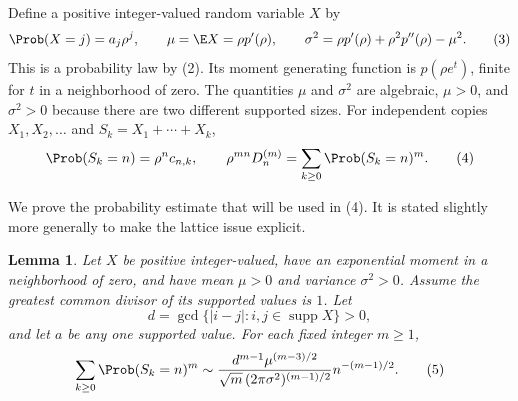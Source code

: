 \documentclass[11pt,a4paper]{article}
\numberwithin{equation}{section}
\newtheorem{lemma}[theorem]{Lemma}
\theoremstyle{definition}
\theoremstyle{remark}
\begin{document}
Define a positive integer-valued random variable $X$ by
\[
 \Prob(X=j)=a_j\rho^j,
 \qquad
 \mu=\E X=\rho p'(\rho),\qquad
 \sigma^2=\rho p'(\rho)+\rho^2p''(\rho)-\mu^2.        \tag{3}
\]
This is a probability law by (2).  Its moment generating function is
$p(\rho e^t)$, finite for $t$ in a neighborhood of zero.  The quantities
$\mu$ and $\sigma^2$ are algebraic, $\mu>0$, and $\sigma^2>0$ because
there are two different supported sizes.  For independent copies
$X_1,X_2,\ldots$ and $S_k=X_1+\cdots+X_k$,
\[
 \Prob(S_k=n)=\rho^n c_{n,k},\qquad
 \rho^{mn}D_n^{(m)}=\sum_{k\ge0}\Prob(S_k=n)^m.       \tag{4}
\]

We prove the probability estimate that will be used in (4).  It is stated
slightly more generally to make the lattice issue explicit.

\begin{lemma}\label{add43taisho:r43:llt}
Let $X$ be positive integer-valued, have an exponential moment in a
neighborhood of zero, and have mean $\mu>0$ and variance $\sigma^2>0$.
Assume the greatest common divisor of its supported values is $1$.
Let
\[
 d=\gcd\{|i-j|:i,j\in\operatorname{supp}X\}>0,
\]
and let $a$ be any one supported value.  For each fixed integer $m\ge1$,
\[
 \sum_{k\ge0}\Prob(S_k=n)^m
 \sim
 \frac{d^{m-1}\mu^{(m-3)/2}}
      {\sqrt m\,(2\pi\sigma^2)^{(m-1)/2}}
       n^{-(m-1)/2}.                                \tag{5}
\]
\end{lemma}
\end{document}
